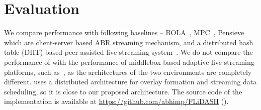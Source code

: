 \section{Evaluation}
\label{sec:chap06:evaluations}
We compare {\our} performance with following baselines -- BOLA~\cite{Spiteri2016}, MPC~\cite{yin2015control}, Pensieve~\cite{mao2017neural} which are client-server based \ac{ABR} streaming mechanism, and a distributed hash table (DHT) based peer-assisted live streaming system~\cite{shen2013dht}. 
We do not compare the performance of {\our} with the performance of middlebox-based adaptive live streaming platforms, such as~\cite{detti2016tracker,payberah2012clive,wang2014migration,khalid2019sdn}, as the architectures of the two environments are completely different. \cite{shen2013dht} uses a distributed architecture for overlay formation and streaming data scheduling, so it is close to our proposed architecture. 
The source code of the implementation is available at \url{https://github.com/abhimp/FLiDASH} (\lastaccessedtoday).

